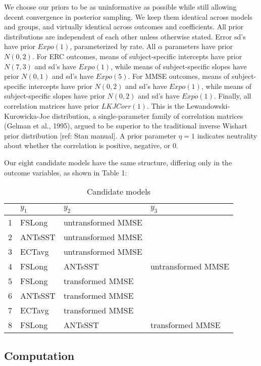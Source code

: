 \documentclass[12pt]{article}
\begin{document}
We choose our priors to be as uninformative as possible while still allowing decent convergence in posterior sampling. We keep them identical across models and groups, and virtually identical across outcomes and coefficients. All prior distributions are independent of each other unless otherwise stated. Error sd's have prior $Expo(1)$, parameterized by rate. All $\alpha$ parameters have prior $N(0,2)$. For ERC outcomes, means of subject-specific intercepts have prior $N(7,3)$ and sd's have $Expo(1)$, while means of subject-specific slopes have prior $N(0,1)$ and sd's have $Expo(5)$. For MMSE outcomes, means of subject-specific intercepts have prior $N(0,2)$ and sd's have $Expo(1)$, while means of subject-specific slopes have prior $N(0,2)$ and sd's have $Expo(1)$. Finally, all correlation matrices have prior $LKJCorr(1)$. This is the Lewandowski-Kurowicka-Joe distribution, a single-parameter 
family of correlation matrices (Gelman et al., 1995), argued to be superior to the traditional inverse Wishart prior distribution {\color{teal}[ref: Stan manual]}. A prior parameter $\eta=1$ indicates neutrality about whether the correlation is positive, negative, or 0. 

Our eight candidate models have the same structure, differing only in the  outcome variables, as shown in Table 1:

\begin{table}[H]
\centering
\caption{Candidate models}
\begin{tabular}{l|l|l|l}
\toprule
& $y_1$ & $y_2$ & $y_3$\\
\midrule
1 & FSLong & untransformed MMSE \\
2 & ANTsSST & untransformed MMSE \\
3 & ECTavg & untransformed MMSE \\
4 & FSLong & ANTsSST & untransformed MMSE \\
5 & FSLong & transformed MMSE \\
6 & ANTsSST & transformed MMSE \\
7 & ECTavg & transformed MMSE \\
8 & FSLong & ANTsSST & transformed MMSE \\
\bottomrule
\end{tabular}
\end{table}

\subsection{Computation}
\end{document}
